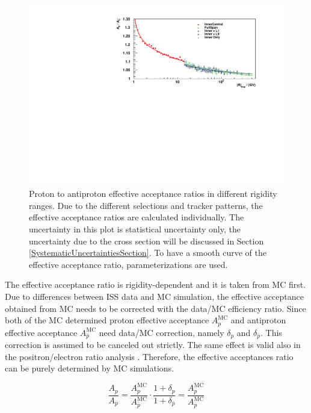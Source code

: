 \begin{figure}[htbp]
\includegraphics[width=1.00\textwidth]{Figures/chapter4/Acceptance/EffectiveAcceptanceRatio/AcceptancePlot.pdf}
\caption[Proton to antiproton effective acceptance ratios.]{Proton to antiproton effective acceptance ratios in different rigidity ranges. Due to the different selections and tracker patterns, the effective acceptance ratios are calculated individually. The uncertainty in this plot is statistical uncertainty only, the uncertainty due to the cross section will be discussed in Section \ref{SystematicUncertaintiesSection}. To have a smooth curve of the effective acceptance ratio, parameterizations are used.}
\label{TheEffectiveAcceptanceRatio}
\end{figure}

The effective acceptance ratio is rigidity-dependent and it is taken from MC first. Due to differences between ISS data and MC simulation, the effective acceptance obtained from MC needs to be corrected with the data/MC efficiency ratio. Since both of the MC determined proton effective acceptance $A^\mathrm{MC}_{p}$ and antiproton effective acceptance $A^\mathrm{MC}_{\bar{p}}$ need data/MC correction, namely $\delta_{p}$ and $\delta_{\bar{p}}$. This correction is assumed to be canceled out strictly. The same effect is valid also in the positron/electron ratio analysis \cite{ZimmermannPhDThesis}. Therefore, the effective acceptances ratio can be purely determined by MC simulations. \par

\begin{equation}
\label{EffectiveAcceptanceRatioCanceledOut}
\frac{A_{p}}{A_{\bar{p}}} = \frac{A^\mathrm{MC}_{p}}{A^\mathrm{MC}_{\bar{p}}} \cdot \frac{1+\delta_{p} }{1+ \delta_{\bar{p}} } = \frac{A^\mathrm{MC}_{p}}{A^\mathrm{MC}_{\bar{p}}}
\end{equation}     

